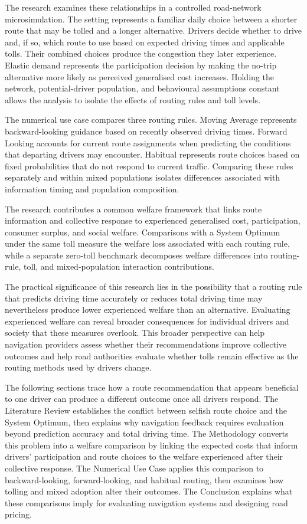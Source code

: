 \documentclass{article}
\begin{document}
The research examines these relationships in a controlled road-network microsimulation. The setting represents a familiar daily choice between a shorter route that may be tolled and a longer alternative. Drivers decide whether to drive and, if so, which route to use based on expected driving times and applicable tolls. Their combined choices produce the congestion they later experience. Elastic demand represents the participation decision by making the no-trip alternative more likely as perceived generalised cost increases. Holding the network, potential-driver population, and behavioural assumptions constant allows the analysis to isolate the effects of routing rules and toll levels.

The numerical use case compares three routing rules. Moving Average represents backward-looking guidance based on recently observed driving times. Forward Looking accounts for current route assignments when predicting the conditions that departing drivers may encounter. Habitual represents route choices based on fixed probabilities that do not respond to current traffic. Comparing these rules separately and within mixed populations isolates differences associated with information timing and population composition.

The research contributes a common welfare framework that links route information and collective response to experienced generalised cost, participation, consumer surplus, and social welfare. Comparisons with a System Optimum under the same toll measure the welfare loss associated with each routing rule, while a separate zero-toll benchmark decomposes welfare differences into routing-rule, toll, and mixed-population interaction contributions.

The practical significance of this research lies in the possibility that a routing rule that predicts driving time accurately or reduces total driving time may nevertheless produce lower experienced welfare than an alternative. Evaluating experienced welfare can reveal broader consequences for individual drivers and society that these measures overlook. This broader perspective can help navigation providers assess whether their recommendations improve collective outcomes and help road authorities evaluate whether tolls remain effective as the routing methods used by drivers change.

The following sections trace how a route recommendation that appears beneficial to one driver can produce a different outcome once all drivers respond. The Literature Review establishes the conflict between selfish route choice and the System Optimum, then explains why navigation feedback requires evaluation beyond prediction accuracy and total driving time. The Methodology converts this problem into a welfare comparison by linking the expected costs that inform drivers' participation and route choices to the welfare experienced after their collective response. The Numerical Use Case applies this comparison to backward-looking, forward-looking, and habitual routing, then examines how tolling and mixed adoption alter their outcomes. The Conclusion explains what these comparisons imply for evaluating navigation systems and designing road pricing.
\end{document}
